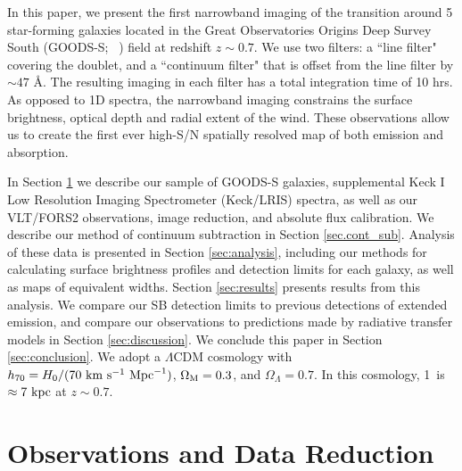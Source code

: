 \documentclass[twocolumn]{aastex61}
\newcommand{\citethnop}[1]{\citeauthor{#1}\ \citeyear{#1}}
\begin{document}
In this paper, we present the first narrowband imaging of the  transition around 5 star-forming  galaxies located in the Great Observatories Origins Deep Survey South (GOODS-S; \citethnop{Giavalisco2004})  field at redshift $z \sim 0.7$. 
We use two filters: a  ``line filter" covering the  doublet, and a ``continuum filter" that is offset from the line filter by ${\sim}47$ \AA.    
The resulting imaging in each filter has a total integration time of 10 hrs. As opposed to 1D spectra, the narrowband imaging constrains the surface brightness, optical depth and radial extent of the wind. These observations allow us to create the first ever high-S/N spatially resolved map of both  emission and absorption. 

In Section \ref{sec:obs_red} we describe our sample of GOODS-S galaxies, supplemental Keck I Low Resolution Imaging Spectrometer (Keck/LRIS) spectra, as well as our VLT/FORS2 observations, image reduction, and absolute flux calibration. We describe our method of continuum subtraction in Section \ref{sec.cont_sub}. Analysis of these data is presented in Section \ref{sec:analysis}, 
including our methods for calculating surface brightness profiles and detection limits for each galaxy, as well as maps of  equivalent widths.
Section \ref{sec:results} presents results from this analysis. We compare our SB detection limits to previous detections of extended  emission,  and compare our observations to predictions made by radiative transfer models in Section \ref{sec:discussion}. We conclude this paper in Section \ref{sec:conclusion}.
We adopt a $\Lambda$CDM cosmology with $h_{70} = H_0/(70\ \rm{ km}\ \rm{ s}^{-1}\ \rm{ Mpc}^{-1})$, $\Omega_{\rm{M}}= 0.3$, and $\Omega_{\Lambda} = 0.7$. In this cosmology, 1\arcsec\  is $\approx 7\ \rm kpc$ at $z \sim 0.7$.


\section{Observations and Data Reduction}\label{sec:obs_red}
\end{document}
